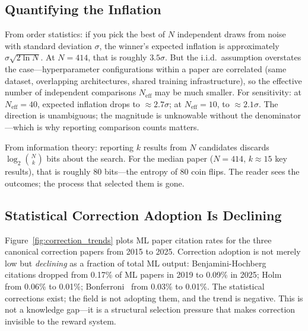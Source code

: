 \documentclass{article}
\begin{document}
\subsection{Quantifying the Inflation}

From order statistics: if you pick the best of $N$ independent draws from noise with standard deviation $\sigma$, the winner's expected inflation is approximately $\sigma\sqrt{2 \ln N}$. At $N = 414$, that is roughly $3.5\sigma$. But the i.i.d.\ assumption overstates the case---hyperparameter configurations within a paper are correlated (same dataset, overlapping architectures, shared training infrastructure), so the effective number of independent comparisons $N_{\text{eff}}$ may be much smaller. For sensitivity: at $N_{\text{eff}} = 40$, expected inflation drops to $\approx 2.7\sigma$; at $N_{\text{eff}} = 10$, to $\approx 2.1\sigma$. The direction is unambiguous; the magnitude is unknowable without the denominator---which is why reporting comparison counts matters.

From information theory: reporting $k$ results from $N$ candidates discards $\log_2\binom{N}{k}$ bits about the search. For the median paper ($N = 414$, $k \approx 15$ key results), that is roughly 80 bits---the entropy of 80 coin flips. The reader sees the outcomes; the process that selected them is gone.

\subsection{Statistical Correction Adoption Is Declining}

Figure~\ref{fig:correction_trends} plots ML paper citation rates for the three canonical correction papers from 2015 to 2025. Correction adoption is not merely low but \textit{declining} as a fraction of total ML output: Benjamini-Hochberg~\citep{benjamini_hochberg_1995} citations dropped from 0.17\% of ML papers in 2019 to 0.09\% in 2025; Holm~\citep{holm_1979} from 0.06\% to 0.01\%; Bonferroni~\citep{dunn_1961} from 0.03\% to 0.01\%. The statistical corrections exist; the field is not adopting them, and the trend is negative. This is not a knowledge gap---it is a structural selection pressure that makes correction invisible to the reward system.
\end{document}
